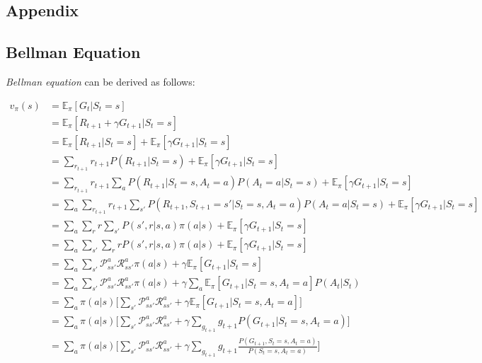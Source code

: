 \renewcommand{\thesection}{\Alph{section}.\arabic{section}}
\setcounter{section}{0}

\begin{appendices}
\chapter{Appendix}

\section{Bellman Equation}

\textit{Bellman equation} can be derived as follows:

\begin{align*}
	v_\pi(s) &= \mathbb{E}_{\pi}[G_t|S_t = s]\\ 
	&= \mathbb{E}_{\pi}[R_{t+1}+\gamma G_{t+1}|S_t = s]\\ 
	&= \mathbb{E}_{\pi}[R_{t+1}|S_t = s] + \mathbb{E}_{\pi}[\gamma G_{t+1}|S_t = s]\\
	&= \sum_{r_{t+1}}r_{t+1} P(R_{t+1}|S_t = s) + \mathbb{E}_{\pi}[\gamma G_{t+1}|S_t = s]\\
	&= \sum_{r_{t+1}}r_{t+1} \sum_a P(R_{t+1}|S_t = s, A_t=a)P(A_t=a|S_t=s) + \mathbb{E}_{\pi}[\gamma G_{t+1}|S_t = s]\\
	&=\sum_a \sum_{r_{t+1}}r_{t+1} \sum_{s'}  P(R_{t+1}, S_{t+1}=s'|S_t = s, A_t=a)P(A_t=a|S_t=s) + \mathbb{E}_{\pi}[\gamma G_{t+1}|S_t = s]\\
&=\sum_a \sum_{r}r \sum_{s'} P(s',r|s, a)\pi(a|s) + \mathbb{E}_{\pi}[\gamma G_{t+1}|S_t = s]\\
&=\sum_a \sum_{s'} \sum_{r}r P(s',r|s, a)\pi(a|s) + \mathbb{E}_{\pi}[\gamma G_{t+1}|S_t = s]\\
&=\sum_a \sum_{s'} \mathcal{P}_{ss'}^a\mathcal{R}_{ss'}^a \pi(a|s)+ \gamma \mathbb{E}_{\pi}[ G_{t+1}|S_t = s]\\
&=\sum_a \sum_{s'}\mathcal{P}_{ss'}^a\mathcal{R}_{ss'}^a \pi(a|s) + \gamma \sum_{a}\mathbb{E}_{\pi}[ G_{t+1}|S_t = s, A_{t}=a]P(A_{t}|S_{t})\\
&=\sum_a \pi(a|s) \Bigg[\sum_{s'} \mathcal{P}_{ss'}^a\mathcal{R}_{ss'}^a + \gamma \mathbb{E}_{\pi}[ G_{t+1}|S_t = s, A_{t}=a]\Bigg]\\
&=\sum_a \pi(a|s)\Bigg[\sum_{s'} \mathcal{P}_{ss'}^a\mathcal{R}_{ss'}^a + \gamma \sum_{g_{t+1}}g_{t+1}P( G_{t+1}|S_t = s, A_{t}=a)\Bigg]\\
&=\sum_a \pi(a|s) \Bigg[\sum_{s'} \mathcal{P}_{ss'}^a\mathcal{R}_{ss'}^a + \gamma \sum_{g_{t+1}}g_{t+1}\frac{P( G_{t+1},S_t = s, A_{t}=a)}{P(S_t = s, A_{t}=a)}\Bigg]\\

\end{align*}
\end{appendices}
